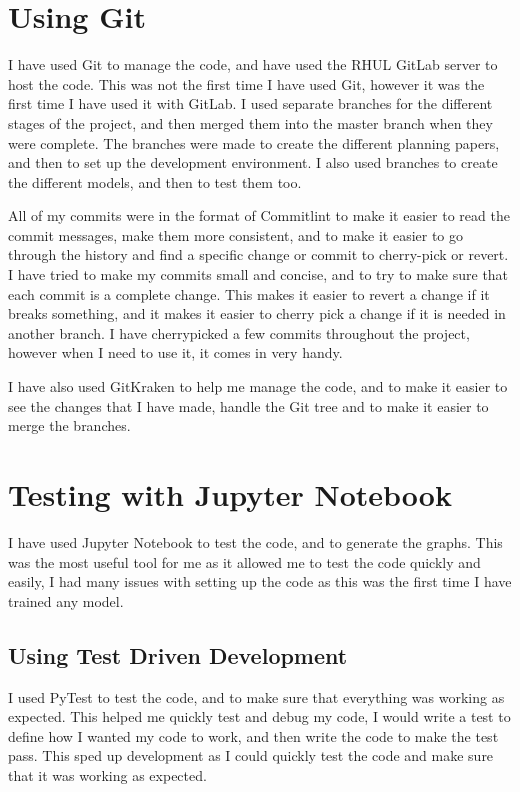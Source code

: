 \documentclass[]{final_report}
\begin{document}
\section{Using Git}
I have used Git to manage the code, and have used the RHUL GitLab server to host the code.
This was not the first time I have used Git, however it was the first time I have used it with GitLab.
I used separate branches for the different stages of the project, and then merged them into the master branch when they were complete.
The branches were made to create the different planning papers, and then to set up the development environment.
I also used branches to create the different models, and then to test them too.

All of my commits were in the format of Commitlint\cite{CommitLint} to make it easier to read the commit messages, make them more consistent,
and to make it easier to go through the history and find a specific change or commit to cherry-pick or revert.
I have tried to make my commits small and concise, and to try to make sure that each commit is a complete change.
This makes it easier to revert a change if it breaks something, and it makes it easier to cherry pick a change if it is needed in another branch. I have cherrypicked a few commits throughout the project, however when I need to use it, it comes in very handy.

I have also used GitKraken\cite{GitKraken} to help me manage the code, and to make it easier to see the changes that I have made, handle the Git tree and to make it easier to merge the branches.

\section{Testing with Jupyter Notebook}
I have used Jupyter Notebook to test the code, and to generate the graphs.
This was the most useful tool for me as it allowed me to test the code quickly and easily,
I had many issues with setting up the code as this was the first time I have trained any model.

\subsection{Using Test Driven Development}
I used PyTest\cite{PyTest} to test the code, and to make sure that everything was working as expected.
This helped me quickly test and debug my code, I would write a test to define how I wanted my code to work, and then write the code to make the test pass.
This sped up development as I could quickly test the code and make sure that it was working as expected.
\end{document}
